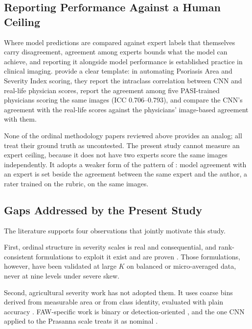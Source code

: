 \documentclass{icsthesis}
\begin{document}
\begin{mainmatter}
			\subsection{Reporting Performance Against a Human Ceiling}\label{sec:ceiling}

				Where model predictions are compared against expert labels that themselves carry
				disagreement, agreement among experts bounds what the model can achieve, and
				reporting it alongside model performance is established practice in clinical
				imaging. \citet{schaap2022} provide a clear template: in automating Psoriasis Area
				and Severity Index scoring, they report the intraclass correlation between CNN and
				real-life physician scores, report the agreement among five PASI-trained physicians
				scoring the same images (ICC 0.706--0.793), and compare the CNN's agreement with the
				real-life scores against the physicians' image-based agreement with them.

				None of the ordinal methodology papers reviewed above provides an analog; all treat
				their ground truth as uncontested. The present study cannot measure an expert
				ceiling, because it does not have two experts score the same images independently.
				It adopts a weaker form of the pattern of \citet{schaap2022}: model agreement with
				an expert is set beside the agreement between the same expert and the author, a
				rater trained on the rubric, on the same images.

			\subsection{Gaps Addressed by the Present Study}\label{sec:gaps}

				The literature supports four observations that jointly motivate this study.

				First, ordinal structure in severity scales is real and consequential, and
				rank-consistent formulations to exploit it exist and are proven
				\citep{cao2020,shi2023corn}. Those formulations, however, have been validated at
				large $K$ on balanced or micro-averaged data, never at nine levels under severe
				skew.

				Second, agricultural severity work has not adopted them. It uses coarse bins derived
				from measurable area or from class identity, evaluated with plain accuracy
				\citep{shi2023severity,haque2022,astani2026,bohra2026}. FAW-specific work is binary
				or detection-oriented
				\citep{sena2003,ishengoma2021,ishengoma2022,zhang2022,%
				sandhya2025,prabha2021,dzurume2025},
				and the one CNN applied to the Prasanna scale treats it as nominal
				\citep{casasola2026}.


\end{mainmatter}
\end{document}
